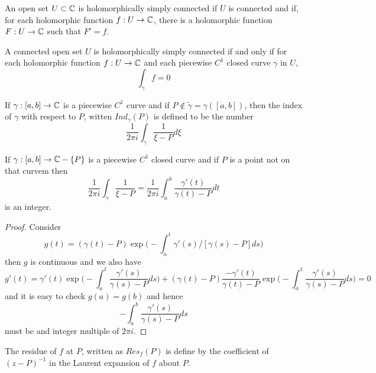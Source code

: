 \begin{definition}
    An open set $U\subset \mathbb{C}$ is holomorphically simply connected if $U$ is connected and if, for each holomorphic function $f:U\to\mathbb{C}$, there is a holomorphic function $F:U\to\mathbb{C}$ such that $F'=f$.
\end{definition}

\begin{lemma}
    A connected open set $U$ is holomorphically simply connected if and only if for each holomorphic function $f:U\to\mathbb{C}$ and each piecewise $C^1$ closed curve $\gamma$ in $U$,
    \[
    \int_{\gamma} f = 0
    \]
\end{lemma}

\begin{definition}
    If $\gamma:[a,b]\to\mathbb{C}$ is a piecewise $C^1$ curve and if $P\notin \tilde{\gamma} = \gamma([a,b])$, then the index of $\gamma$ with respect to $P$, witten $Ind_{\gamma}(P)$ is defined to be the number
    \[\dfrac{1}{2\pi i}\int_{\gamma}\dfrac{1}{\xi-P}d\xi\]
\end{definition}

\begin{lemma}
    If $\gamma:[a,b]\to\mathbb{C}-\{P\}$ is a piecewise $C^1$ closed curve and if $P$ is a point not on that curvem then
    \[
    \dfrac{1}{2\pi i }\int_{\gamma}\dfrac{1}{\xi-P} = \dfrac{1}{2\pi i}\int_a^b\dfrac{\gamma'(t)}{\gamma(t)-P}dt
    \]
    is an integer.
\end{lemma}
\begin{proof}\par
    Consider
    \[
    g(t) = (\gamma(t)-P)\exp{\Big(-\int_a^t\gamma'(s)/[\gamma(s)-P]ds\Big)} 
    \]
    then $g$ is continuous and we also have
    \[
    g'(t) = \gamma'(t)\exp{\Big(-\int_a^t \dfrac{\gamma'(s)}{\gamma(s)-P}ds\Big)} + (\gamma(t)-P)\dfrac{-\gamma'(t)}{\gamma(t)-P}\exp{\Big(-\int_a^t\dfrac{\gamma'(s)}{\gamma(s)-P}ds\Big)} = 0
    \]
    and it is easy to check $g(a) = g(b)$ and hence
    \[
    -\int_a^b \dfrac{\gamma'(s)}{\gamma(s)-P}ds
    \]
    must be and integer multiple of $2\pi i$.
\end{proof}

\begin{definition}
    The residue of $f$ at $P$, written as $Res_f(P)$ is define by the coefficient of $(z-P)^{-1}$ in the Laurent expansion of $f$ about $P$.
\end{definition}

